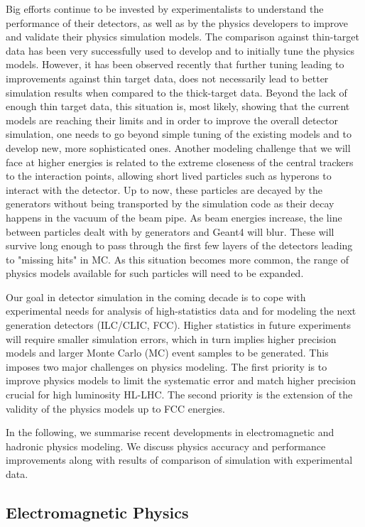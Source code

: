 \documentclass[12pt,a4paper]{article}
\begin{document}
Big efforts continue to be invested by experimentalists to understand
the performance of their detectors, as well as by the physics developers
to improve and validate their physics simulation models. The comparison
against thin-target data has been very successfully used to develop and
to initially tune the physics models. However, it has been observed
recently that further tuning leading to improvements against thin target
data, does not necessarily lead to better simulation results when
compared to the thick-target data. Beyond the lack of enough thin target
data, this situation is, most likely, showing that the current models
are reaching their limits and in order to improve the overall detector
simulation, one needs to go beyond simple tuning of the existing models
and to develop new, more sophisticated ones. Another modeling challenge
that we will face at higher energies is related to the extreme closeness
of the central trackers to the interaction points, allowing short lived
particles such as hyperons to interact with the detector. Up to now,
these particles are decayed by the generators without being transported
by the simulation code as their decay happens in the vacuum of the beam
pipe. As beam energies increase, the line between particles dealt with
by generators and Geant4 will blur. These will survive long enough to
pass through the first few layers of the detectors leading to "missing
hits" in MC. As this situation becomes more common, the range of physics
models available for such particles will need to be expanded.

Our goal in detector simulation in the coming decade is to cope with
experimental needs for analysis of high-statistics data and for modeling
the next generation detectors (ILC/CLIC, FCC). Higher statistics in
future experiments will require smaller simulation errors, which in turn
implies higher precision models and larger Monte Carlo (MC) event
samples to be generated. This imposes two major challenges on physics
modeling. The first priority is to improve physics models to limit the
systematic error and match higher precision crucial for high luminosity
HL-LHC. The second priority is the extension of the validity of the
physics models up to FCC energies.

In the following, we summarise recent developments in electromagnetic
and hadronic physics modeling. We discuss physics accuracy and
performance improvements along with results of comparison of simulation
with experimental data.

\hypertarget{electromagnetic-physics}{%
\subsection{Electromagnetic Physics}\label{electromagnetic-physics}}
\end{document}
